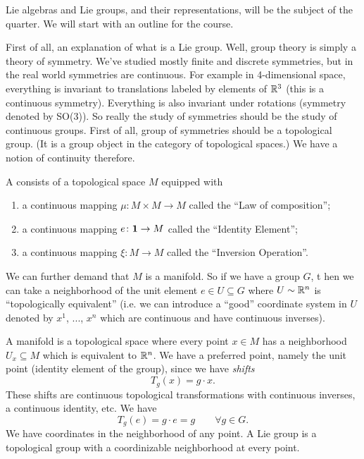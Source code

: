
Lie algebras and Lie groups, and their representations, will be
the subject of the quarter. We  will start with an outline for
the course.

First of all, an explanation of what is a Lie group. Well, group
theory is simply a theory of symmetry. We've studied mostly
finite and discrete symmetries, but in the real world symmetries
are continuous. For example in 4-dimensional space, everything is
invariant to translations labeled by elements of $\Bbb{R}^{3}$
(this is a continuous symmetry). Everything is also invariant
under rotations (symmetry denoted by SO(3)). So really the study
of symmetries should be the study of continuous groups. First of
all, group of symmetries should be a topological group. (It is a
group object in the category of topological spaces.) We have a
notion of continuity therefore.
\begin{defn}
A  consists of a topological space $M$
equipped with
\begin{enumerate}
\item a continuous mapping $\mu\colon M\times M\to M$ called the
  ``Law of composition'';
\item a continuous mapping $e\colon{\bf 1}\to M$ called the
  ``Identity Element'';
\item a continuous mapping $\xi\colon M\to M$ called the
  ``Inversion Operation''.
\end{enumerate}
\end{defn}
We can further demand that $M$ is a manifold. So if we have a
group $G$, t hen we can take a neighborhood of the unit element
$e\in U\subseteq G$ where $U\sim\Bbb{R}^{n}$ is ``topologically
equivalent'' (i.e. we can introduce a ``good'' coordinate system
in $U$ denoted by $x^1$, ..., $x^n$ which are continuous and have
continuous inverses).

A manifold is a topological space where every point $x\in M$ has
a neighborhood $U_{x}\subseteq M$ which is equivalent to
$\Bbb{R}^{n}$. We have a preferred point, namely the unit point
(identity element of the group), since we have \emph{shifts}
\begin{equation}
T_{g}(x)=g\cdot x.
\end{equation}
These shifts are continuous topological transformations with
continuous inverses, a continuous identity, etc. We have 
\begin{equation}
T_{g}(e)=g\cdot e=g \qquad\forall g\in G.
\end{equation}
We have coordinates in the neighborhood of any point. A Lie group
is a topological group with a coordinizable neighborhood at every
point.

